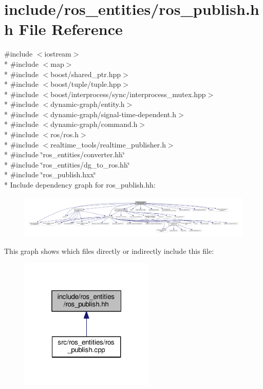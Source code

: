 \hypertarget{ros__publish_8hh}{}\section{include/ros\+\_\+entities/ros\+\_\+publish.hh File Reference}
\label{ros__publish_8hh}
{\ttfamily \#include $<$iostream$>$}\\*
{\ttfamily \#include $<$map$>$}\\*
{\ttfamily \#include $<$boost/shared\+\_\+ptr.\+hpp$>$}\\*
{\ttfamily \#include $<$boost/tuple/tuple.\+hpp$>$}\\*
{\ttfamily \#include $<$boost/interprocess/sync/interprocess\+\_\+mutex.\+hpp$>$}\\*
{\ttfamily \#include $<$dynamic-\/graph/entity.\+h$>$}\\*
{\ttfamily \#include $<$dynamic-\/graph/signal-\/time-\/dependent.\+h$>$}\\*
{\ttfamily \#include $<$dynamic-\/graph/command.\+h$>$}\\*
{\ttfamily \#include $<$ros/ros.\+h$>$}\\*
{\ttfamily \#include $<$realtime\+\_\+tools/realtime\+\_\+publisher.\+h$>$}\\*
{\ttfamily \#include \char`\"{}ros\+\_\+entities/converter.\+hh\char`\"{}}\\*
{\ttfamily \#include \char`\"{}ros\+\_\+entities/dg\+\_\+to\+\_\+ros.\+hh\char`\"{}}\\*
{\ttfamily \#include \char`\"{}ros\+\_\+publish.\+hxx\char`\"{}}\\*
Include dependency graph for ros\+\_\+publish.\+hh\+:
\nopagebreak
\begin{figure}[H]
\begin{center}
\leavevmode
\includegraphics[width=350pt]{ros__publish_8hh__incl}
\end{center}
\end{figure}
This graph shows which files directly or indirectly include this file\+:
\nopagebreak
\begin{figure}[H]
\begin{center}
\leavevmode
\includegraphics[width=181pt]{ros__publish_8hh__dep__incl}
\end{center}
\end{figure}
